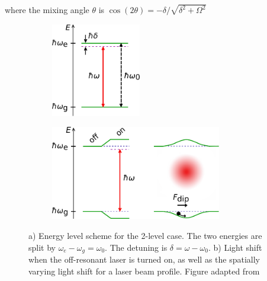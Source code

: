 where the mixing angle $\theta$ is $\cos{(2\theta)}=-\delta / \sqrt{\delta^2+\Omega^2}$

\begin{figure}
	\centering
		\begin{subfigure}{.29\textwidth}
			\centering
			\includegraphics[height=4.1cm]{figures/2LevelAtom.pdf}
			\caption{}
			\label{fig:2LevelAtom}
		\end{subfigure}
		\begin{subfigure}{.69\textwidth}
			\centering
			\includegraphics[height=4.1cm]{figures/LightShift.pdf}
			\caption{}
			\label{fig:DipoleForce}
		\end{subfigure}
		\caption{a) Energy level scheme for the 2-level case. The two energies are split by $\omega_e - \omega_g = \omega_0$. The detuning is $\delta = \omega-\omega_0$.  b) Light shift when the off-resonant laser is turned on, as well as the spatially varying light shift for a laser beam profile. Figure adapted from \cite{Grimm2000}}
\end{figure}
